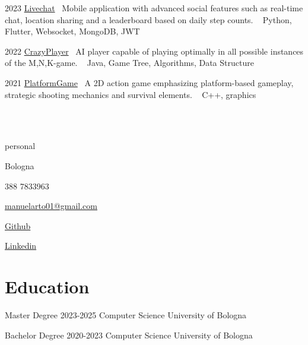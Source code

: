 \documentclass{tccv}
\begin{document}
\begin{yearlist}

\item{2023}
     {\href{https://github.com/manuelarto/livechat}{Livechat}}
     {\textbullet~Mobile application with advanced social features such as real-time chat, location sharing and a leaderboard based on daily step counts. \newline
    \textbullet~ Python, Flutter, Websocket, MongoDB, JWT}
\item{2022}
     {\href{https://github.com/manuelarto/crazyplayer}{CrazyPlayer}}
     {\textbullet~AI player capable of playing optimally in all possible instances of the M,N,K-game. \newline
    \textbullet~ Java, Game Tree, Algorithms, Data Structure}
\item{2021}
     {\href{https://github.com/manuelarto/platformgame}{PlatformGame}}
     {\textbullet~A 2D action game emphasizing platform-based gameplay, strategic shooting mechanics and survival elements. \newline
    \textbullet~ C++, graphics}

\end{yearlist}
\\ \\ 

\begin{keyvaluelist}{personal}
    \item[\faHome] Bologna
    \item[\faPhone] 388 7833963
    \item[\faEnvelope] \href{mailto:my@email.address}{manuelarto01@gmail.com}
    \item[\faGithub] \href{https://github.com/manuelarto}{Github}
    \item[\faLinkedin] \href{https://www.linkedin.com/in/manuel-arto-696012203/}{Linkedin}
\end{keyvaluelist}


\section{Education}

\begin{yearlist}

\item[Master Degree]{2023-2025}
     {Computer Science}
     {University of Bologna}

\item[Bachelor Degree]{2020-2023}
    {Computer Science}
    {University of Bologna}

\end{yearlist}
\end{document}
